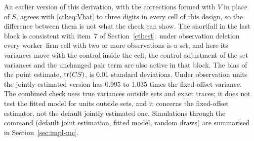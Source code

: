 An earlier version of this derivation, with the corrections formed with $V$ in place of $S$, agrees with
\eqref{ctl:eq:Vhat} to three digits in every cell of this design, so the difference between them is not what the
check can show. The shortfall in the last block is consistent with item~7 of Section~\ref{ctl:est}: under
observation deletion every worker--firm cell with two or more observations is a set, and here its variances move
with the control inside the cell; the control adjustment of the set variances and the unchanged pair term are also
active in that block. The bias of the point estimate, $\operatorname{tr}(CS)$, is 0.01 standard deviations. Under observation
units the jointly estimated version has 0.995 to 1.035 times the fixed-offset variance. The combined check uses
true variances outside sets and exact traces; it does not test the fitted model for units outside sets, and it
concerns the fixed-offset estimator, not the default jointly estimated one. Simulations through the command
(default joint estimation, fitted model, random draws) are summarised in Section~\ref{sec:impl-mc}.
